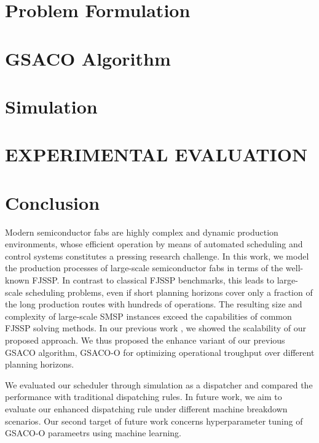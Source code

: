 \documentclass[runningheads]{llncs}
\begin{document}
\section{Problem Formulation}
\label{sec:problem_f}


\section{GSACO Algorithm}
\label{sec:gsaco}


\section{Simulation}
\label{sec:sim}


\section{\uppercase{Experimental Evaluation}}
\label{sec:results}



\section{Conclusion}
\label{sec:conclusion}

Modern semiconductor fabs are highly complex and dynamic production
environments, whose efficient operation by means of automated scheduling
and control systems constitutes a pressing research challenge.
In this work, we model the production processes of large-scale
semiconductor fabs in terms of the well-known FJSSP.
In contrast to classical FJSSP benchmarks,
this leads to large-scale scheduling problems,
even if short planning horizons cover only a fraction of the long
production routes with hundreds of operations.
The resulting size and complexity of large-scale SMSP instances
exceed the capabilities of common FJSSP solving methods.
In our previous work \cite{Ali2024}, we showed the scalability of our proposed approach. 
We thus proposed the enhance variant of our previous GSACO algorithm, GSACO-O for optimizing operational troughput over different planning horizons.

We evaluated our scheduler through simulation as a dispatcher and compared the performance with traditional dispatching rules. In future work, we aim to evaluate our enhanced dispatching rule under different machine breakdown scenarios. 
Our second target of future work concerns hyperparameter tuning of GSACO-O parameetrs using machine learning.
\end{document}
